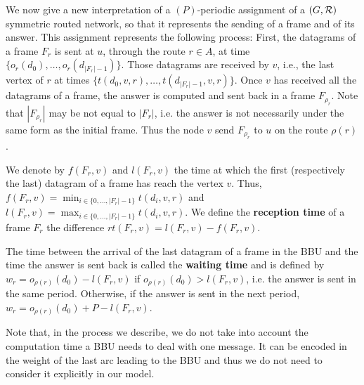\documentclass[10pt]{article}
\begin{document}
      We now give a new interpretation of a $(P)$-periodic assignment of a $(G,{\cal R})$ symmetric routed network, so that it represents the sending of a frame and of its answer.
      This assignment represents the following process: First, the datagrams of a frame $F_r$ is sent at $u$, through the route $r \in A$, at time $\{o_r(d_0),\ldots,o_r(d_{|F_r|-1}) \}$.
      Those datagrams are received by $v$, i.e., the last vertex of $r$ at times $\{t(d_0,v,r),\ldots,t(d_{|F_r|-1},v,r)\}$. 
     Once $v$ has received all the datagrams of a frame, the answer is computed and sent back in a frame $F_{\rho_r}$. Note that $|F_{\rho_r}|$ may be not equal to $|F_r|$, i.e. the answer is not necessarily under the same form as the initial frame. Thus the node $v$ send $F_{\rho_r}$ to  $u$ on the route $\rho(r)$.
      
      We denote by $ f(F_r,v)$ and $l(F_r,v)$ the time at which the first (respectively the last) datagram of a frame has reach the vertex $v$. Thus, $f(F_r,v) =  \displaystyle \min_{i \in \{0,\ldots,|F_r|-1\}} t(d_i,v,r)$ and $l(F_r,v) =  \displaystyle \max_{i \in \{0,\ldots,|F_r|-1\}} t(d_i,v,r)$.
      We define the {\bf reception time} of a frame $F_r$ the difference $rt(F_r,v) = l(F_r,v) - f(F_r,v)$.
      
      
      The time between the arrival of the last datagram of a frame in the BBU and the time the answer is sent back is called the \textbf{waiting time} and is defined by $w_r = o_{\rho(r)}(d_0) - l(F_r,v)$ if $o_{\rho(r)}(d_0) > l(F_r,v)$, i.e. the answer is sent in the same period. Otherwise, if the answer is sent in the next period, $w_r = o_{\rho(r)}(d_0) + P - l(F_r,v)$. %
 
%      
      Note that, in the process we describe, we do not take into account the computation time a BBU needs to deal with one message. It can be encoded in the weight of the last arc leading to the BBU and thus we do not need to consider it explicitly in our model. 
      
\end{document}
